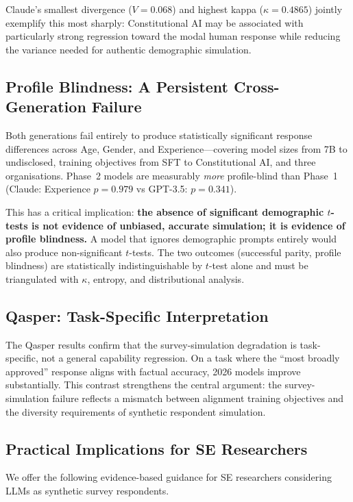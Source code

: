 \documentclass[12pt,a4paper]{article}
\begin{document}
Claude's smallest divergence ($V{=}0.068$) and highest kappa
($\kappa{=}0.4865$) jointly exemplify this most sharply:
Constitutional AI may be associated with particularly strong regression
toward the modal human response while reducing the variance needed for
authentic demographic simulation.

\subsection{Profile Blindness: A Persistent Cross-Generation Failure}
\label{sec:disc:blindness}

Both generations fail entirely to produce statistically significant
response differences across Age, Gender, and Experience---covering
model sizes from 7B to undisclosed, training objectives from SFT to
Constitutional AI, and three organisations.
Phase~2 models are measurably \emph{more} profile-blind than Phase~1
(Claude: Experience $p{=}0.979$ vs GPT-3.5: $p{=}0.341$).

This has a critical implication: \textbf{the absence of significant
demographic $t$-tests is not evidence of unbiased, accurate simulation;
it is evidence of profile blindness.}
A model that ignores demographic prompts entirely would also produce
non-significant $t$-tests.
The two outcomes (successful parity, profile blindness) are
statistically indistinguishable by $t$-test alone and must be
triangulated with $\kappa$, entropy, and distributional analysis.

\subsection{Qasper: Task-Specific Interpretation}
\label{sec:disc:qasper}

The Qasper results confirm that the survey-simulation degradation is
task-specific, not a general capability regression.
On a task where the ``most broadly approved'' response aligns with
factual accuracy, 2026 models improve substantially.
This contrast strengthens the central argument: the survey-simulation
failure reflects a mismatch between alignment training objectives and
the diversity requirements of synthetic respondent simulation.

\subsection{Practical Implications for SE Researchers}
\label{sec:disc:guidance}

We offer the following evidence-based guidance for SE researchers
considering LLMs as synthetic survey respondents.
\end{document}
